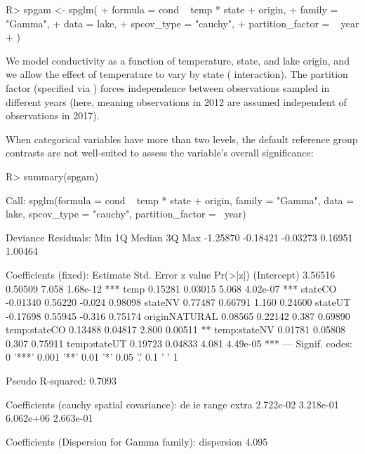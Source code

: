 \documentclass[
]{jss}
\begin{document}
\begin{CodeChunk}
\begin{CodeInput}
R> spgam <- spglm(
+   formula = cond ~ temp * state + origin, 
+    family = "Gamma",
+    data = lake,
+    spcov_type = "cauchy",
+    partition_factor = ~ year
+  )
\end{CodeInput}
\end{CodeChunk}

We model conductivity as a function of temperature, state, and lake
origin, and we allow the effect of temperature to vary by state
( interaction). The  partition factor
(specified via ) forces independence between
observations sampled in different years (here, meaning observations in
2012 are assumed independent of observations in 2017).

When categorical variables have more than two levels, the default
reference group contrasts are not well-suited to assess the variable's
overall significance:

\begin{CodeChunk}
\begin{CodeInput}
R> summary(spgam)
\end{CodeInput}
\begin{CodeOutput}

Call:
spglm(formula = cond ~ temp * state + origin, family = "Gamma", 
    data = lake, spcov_type = "cauchy", partition_factor = ~year)

Deviance Residuals:
     Min       1Q   Median       3Q      Max 
-1.25870 -0.18421 -0.03273  0.16951  1.00464 

Coefficients (fixed):
              Estimate Std. Error z value Pr(>|z|)    
(Intercept)    3.56516    0.50509   7.058 1.68e-12 ***
temp           0.15281    0.03015   5.068 4.02e-07 ***
stateCO       -0.01340    0.56220  -0.024  0.98098    
stateNV        0.77487    0.66791   1.160  0.24600    
stateUT       -0.17698    0.55945  -0.316  0.75174    
originNATURAL  0.08565    0.22142   0.387  0.69890    
temp:stateCO   0.13488    0.04817   2.800  0.00511 ** 
temp:stateNV   0.01781    0.05808   0.307  0.75911    
temp:stateUT   0.19723    0.04833   4.081 4.49e-05 ***
---
Signif. codes:  0 '***' 0.001 '**' 0.01 '*' 0.05 '.' 0.1 ' ' 1

Pseudo R-squared: 0.7093

Coefficients (cauchy spatial covariance):
       de        ie     range     extra 
2.722e-02 3.218e-01 6.062e+06 2.663e-01 

Coefficients (Dispersion for Gamma family):
dispersion 
     4.095 
\end{CodeOutput}
\end{CodeChunk}
\end{document}
